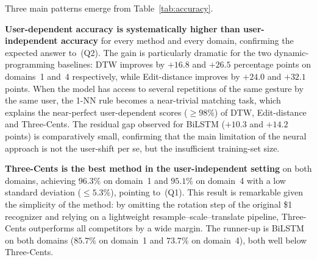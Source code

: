 \begin{table}[H]
\centering
\caption{Mean test accuracy (\%) $\pm$ standard deviation across 10 folds.
Best result per column in \textbf{bold}.}
\label{tab:accuracy}
\end{table}
 
Three main patterns emerge from Table~\ref{tab:accuracy}.
 
\textbf{User-dependent accuracy is systematically higher than
user-independent accuracy} for every method and every domain, confirming the
expected answer to~(Q2). The gain is particularly dramatic for the two
dynamic-programming baselines: DTW improves by $+16.8$ and $+26.5$ percentage
points on domains~1 and~4 respectively, while Edit-distance improves by $+24.0$
and $+32.1$ points. When the model has access to several repetitions of the
same gesture by the same user, the 1-NN rule becomes a near-trivial matching
task, which explains the near-perfect user-dependent scores
($\geq 98\%$) of DTW, Edit-distance and Three-Cents. The residual
gap observed for BiLSTM ($+10.3$ and $+14.2$ points) is comparatively small,
confirming that the main limitation of the neural approach is not the
user-shift per se, but the insufficient training-set size.
 
\textbf{Three-Cents is the best method in the user-independent setting} on
both domains, achieving $96.3\%$ on domain~1 and $95.1\%$ on domain~4 with a
low standard deviation ($\leq 5.3\%$), pointing to~(Q1). This result is
remarkable given the simplicity of the method: by omitting the rotation step
of the original \$1 recognizer and relying on a lightweight resample–scale–translate
pipeline, Three-Cents outperforms all competitors by a wide margin.
The runner-up is BiLSTM on both domains ($85.7\%$ on domain~1 and
$73.7\%$ on domain~4), both well below Three-Cents.
 
